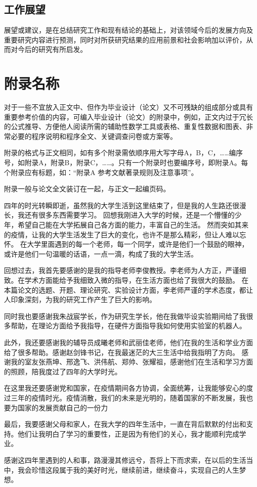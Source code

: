 \documentclass{seuthesis-2022}
\numberwithin{equation}{section}
\begin{document}
\section{工作展望}
展望或建议，是在总结研究工作和现有结论的基础上，对该领域今后的发展方向及重要研究内容进行预测，同时对所获研究结果的应用前景和社会影响加以评价，从而对今后的研究有所启发。

\nocite{*}





\appendix
\chapter{附录名称}
对于一些不宜放入正文中、但作为毕业设计（论文）又不可残缺的组成部分或具有重要参考价值的内容，可编入毕业设计（论文）的附录中，例如，正文内过于冗长的公式推导、方便他人阅读所需的辅助性数学工具或表格、重复性数据和图表、非常必要的程序说明和程序全文、关键调查问卷或方案等。

附录的格式与正文相同，如有多个附录需依顺序用大写字母A，B，C，……编序号，如附录A，附录B，附录C，……。只有一个附录时也要编序号，即附录A。每个附录应有标题，如：“附录A 参考文献著录规则及注意事项”。

附录一般与论文全文装订在一起，与正文一起编页码。


\begin{acknowledgement}
四年的时光转瞬即逝，虽然我的大学生活到这里结束了，但是我的人生路还很漫长，我还有很多东西需要学习。
回想我刚进入大学的时候，还是一个懵懂的少年，希望自己能在大学拓展自己各方面的能力，丰富自己的生活。
然而突如其来的疫情，让我的大学生活发生了巨大的变化，也许不是那么精彩，但让人难以忘怀。
在大学里面遇到的每一个老师，每一个同学，或许是他们一个鼓励的眼神，或许是他们一句温暖的话语，一点一滴，构成了我的大学生活。

回想过去，我首先要感谢的是我的指导老师李俊教授。李老师为人方正，严谨细致。在学术方面能给予我细致入微的指导，在生活方面也给了我很大的鼓励。
在本篇论文的选题、开题、理论研究、实验设计方面，李老师严谨的学术态度，都让人印象深刻，为我的研究工作产生了巨大的影响。

同时我也要感谢我朱战宸学长，作为研究生学长，他在我做毕设实验期间给了我很多帮助，在理论方面给予我指导，在硬件方面指导我如何使用实验室的机器人。

此外，我还要感谢我的辅导员成曦老师和武丽佳老师，他们在我的生活和学业方面给了很多帮助。感谢赵剑锋书记，在我最迷茫的大三生活中给我指明了方向。
感谢我的室友张燕坤、邢逸飞、洪伟航、郑帅、张耀祖，感谢他们在生活和学习方面的照顾，陪我度过了四年的大学时光。

在这里我还要感谢党和国家，在疫情期间各方协调，全面统筹，让我能够安心的度过三年的疫情时光。疫情消散，我们的未来是光明的，随着国家的不断发展，我也要为国家的发展贡献自己的一份力

最后，我要感谢父母和家人，在我大学的四年生活中，一直在背后默默的付出和支持。他们让我明白了学习的重要性，正是因为有他们的关心，我才能顺利完成学业。

感谢这四年里遇到的人和事，路漫漫其修远兮，吾将上下而求索，在以后的生活当中，我会珍惜这段属于我的美好时光，继续前进，继续奋斗，实现自己的人生梦想。
\end{acknowledgement}
\end{document}
